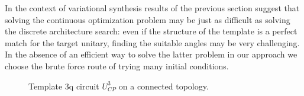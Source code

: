 \documentclass[twocolumn, amsfonts, amssymb, aps, nofootinbib]{revtex4-2}
\begin{document}
In the context of variational synthesis results of the previous section suggest that solving the continuous optimization problem may be just as difficult as solving the discrete architecture search: even if the structure of the template is a perfect match for the target unitary, finding the suitable angles may be very challenging. In the absence of an efficient way to solve the latter problem in our approach we choose the brute force route of trying many initial conditions. 
\begin{figure*}
	\caption{ Template 3q circuit $U_{CP}^3$ on a connected topology.}
	\label{fig cp template}
\end{figure*}
\end{document}
